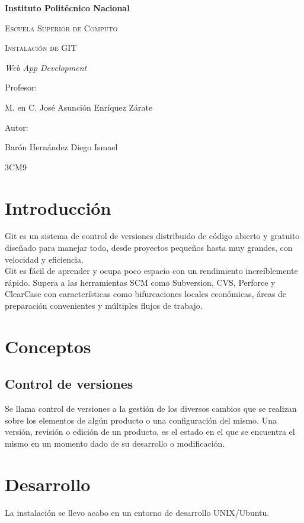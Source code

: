 \documentclass{article}
\begin{document}
	\begin{titlepage}
		\centering
		{\bfseries\LARGE Instituto Politécnico Nacional \par}
		\vspace{1cm}
		{\scshape\Large Escuela Superior de Computo \par}
		\vspace{3cm}
		{\scshape\Huge Instalación de GIT \par}
		\vspace{3cm}
		{\itshape\Large Web App Development \par}
		\vfill
		{\Large Profesor: \par}
		{\Large M. en C. José Asunción Enríquez Zárate \par}
		\vspace{1cm}
		{\Large Autor: \par}
		{\Large Barón Hernández Diego Ismael \par}
		\vfill
		{\Large 3CM9 \par}
	\end{titlepage}
	\newpage
	\tableofcontents
	\newpage
	\section{Introducción}
		Git es un sistema de control de versiones distribuido de código abierto y gratuito diseñado para manejar todo, desde proyectos pequeños hasta muy grandes, con velocidad y eficiencia.\\
		Git es fácil de aprender y ocupa poco espacio con un rendimiento increíblemente rápido. Supera a las herramientas SCM como Subversion, CVS, Perforce y ClearCase con características como bifurcaciones locales económicas, áreas de preparación convenientes y múltiples flujos de trabajo.
	\section{Conceptos}
		\subsection{Control de versiones}
			Se llama control de versiones a la gestión de los diversos cambios que se realizan sobre los elementos de algún producto o una configuración del mismo. Una versión, revisión o edición de un producto, es el estado en el que se encuentra el mismo en un momento dado de su desarrollo o modificación.
	\section{Desarrollo}
		La instalación se llevo acabo en un entorno de desarrollo UNIX/Ubuntu.
\end{document}

